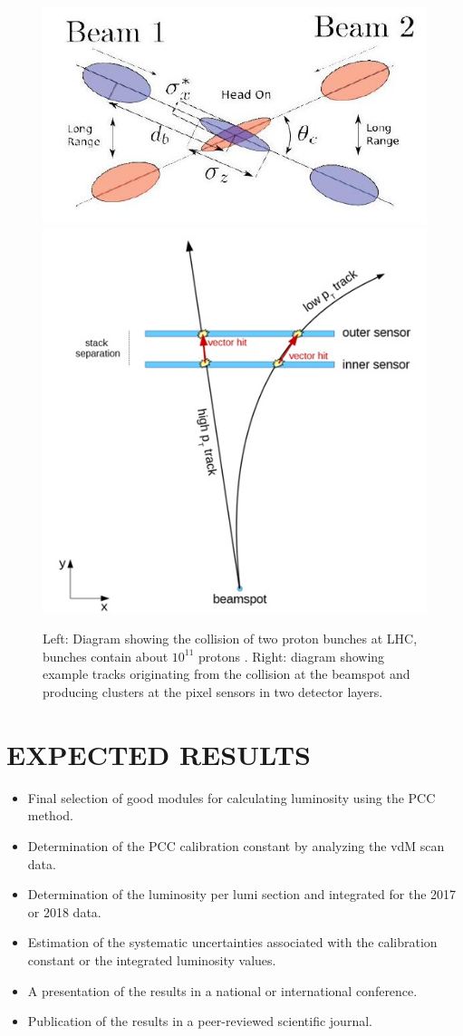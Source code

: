 \documentclass[final,12pt]{article}
\begin{document}
\begin{figure}[H]
  \centering
  \includegraphics[width=0.5\columnwidth]{./bunchcrossing.jpg}
  \includegraphics[width=0.4\columnwidth]{./vectorhit1.jpg}
  \caption{
    Left: Diagram showing the collision of two proton bunches at LHC, bunches contain about $10^{11}$ protons  \cite{deMaria:2008zzb}.
    Right: diagram showing example tracks originating from the collision at the beamspot and producing clusters at the pixel sensors in two detector layers.
  }
  \label{fig:trackcluster}
\end{figure}






\section{EXPECTED RESULTS}

\begin{itemize}
\item Final selection of good modules for calculating luminosity using the PCC method.
\item Determination of the PCC calibration constant by analyzing the vdM scan data.
\item Determination of the luminosity per lumi section and integrated for the 2017 or 2018 data.
\item Estimation of the systematic uncertainties associated with the calibration constant or the integrated luminosity values.
\item A presentation of the results in a national or international conference.
\item Publication of the results in a peer-reviewed scientific journal.
\end{itemize}
\end{document}
